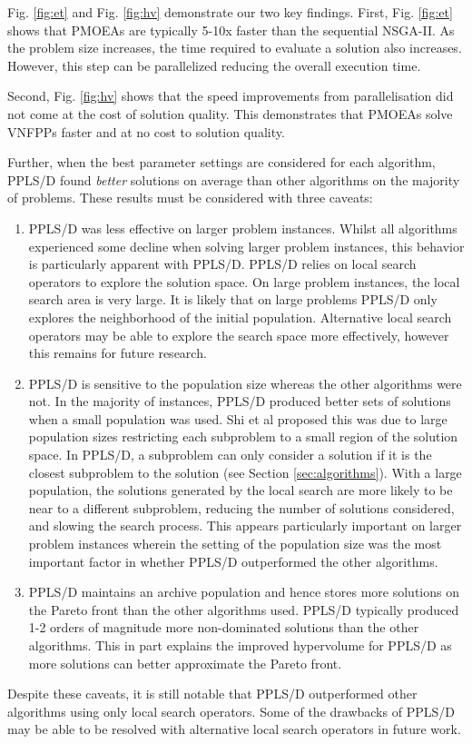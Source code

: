Fig. \ref{fig:et} and Fig. \ref{fig:hv} demonstrate our two key findings. First, Fig. \ref{fig:et} shows that PMOEAs are typically 5-10x faster than the sequential NSGA-II. As the problem size increases, the time required to evaluate a solution also increases. However, this step can be parallelized reducing the overall execution time.

Second, Fig. \ref{fig:hv} shows that the speed improvements from parallelisation did not come at the cost of solution quality. This demonstrates that PMOEAs solve VNFPPs faster and at no cost to solution quality.

Further, when the best parameter settings are considered for each algorithm, PPLS/D found \textit{better} solutions on average than other algorithms on the majority of problems. These results must be considered with three caveats:

\begin{enumerate}
    \item PPLS/D was less effective on larger problem instances. Whilst all algorithms experienced some decline when solving larger problem instances, this behavior is particularly apparent with PPLS/D. PPLS/D relies on local search operators to explore the solution space. On large problem instances, the local search area is very large. It is likely that on large problems PPLS/D only explores the neighborhood of the initial population. Alternative local search operators may be able to explore the search space more effectively, however this remains for future research.

    \item PPLS/D is sensitive to the population size whereas the other algorithms were not. In the majority of instances, PPLS/D produced better sets of solutions when a small population was used. Shi et al \cite{ShiZS20} proposed this was due to large population sizes restricting each subproblem to a small region of the solution space. In PPLS/D, a subproblem can only consider a solution if it is the closest subproblem to the solution (see Section \ref{sec:algorithms}). With a large population, the solutions generated by the local search are more likely to be near to a different subproblem, reducing the number of solutions considered, and slowing the search process. This appears particularly important on larger problem instances wherein the setting of the population size was the most important factor in whether PPLS/D outperformed the other algorithms. 

    \item PPLS/D maintains an archive population and hence stores more solutions on the Pareto front than the other algorithms used. PPLS/D typically produced 1-2 orders of magnitude more non-dominated solutions than the other algorithms. This in part explains the improved hypervolume for PPLS/D as more solutions can better approximate the Pareto front.
\end{enumerate}

Despite these caveats, it is still notable that PPLS/D outperformed other algorithms using only local search operators. Some of the drawbacks of PPLS/D may be able to be resolved with alternative local search operators in future work.